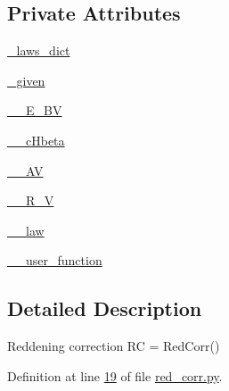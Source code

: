 \subsection*{Private Attributes}
\begin{DoxyCompactItemize}
\item 
\hyperlink{classpyneb_1_1extinction_1_1red__corr_1_1_red_corr_a96fbed6f54a26dd2f59fe6441c9c3865}{\-\_\-laws\-\_\-dict}
\item 
\hyperlink{classpyneb_1_1extinction_1_1red__corr_1_1_red_corr_a99ab4dcd33d50360f4fb61bc80fc90d5}{\-\_\-given}
\item 
\hyperlink{classpyneb_1_1extinction_1_1red__corr_1_1_red_corr_ad223ec4556fb47fc607488c318e58b13}{\-\_\-\-\_\-\-E\-\_\-\-B\-V}
\item 
\hyperlink{classpyneb_1_1extinction_1_1red__corr_1_1_red_corr_ab91dff40a007dd632c35d98042077f3d}{\-\_\-\-\_\-c\-Hbeta}
\item 
\hyperlink{classpyneb_1_1extinction_1_1red__corr_1_1_red_corr_a476840870719872a12ab48a0d1f1a839}{\-\_\-\-\_\-\-A\-V}
\item 
\hyperlink{classpyneb_1_1extinction_1_1red__corr_1_1_red_corr_a93f7e44201375bc6e05a20c092b6a1d6}{\-\_\-\-\_\-\-R\-\_\-\-V}
\item 
\hyperlink{classpyneb_1_1extinction_1_1red__corr_1_1_red_corr_a08b0e3499e1b8a289d7b2c7e805e6129}{\-\_\-\-\_\-law}
\item 
\hyperlink{classpyneb_1_1extinction_1_1red__corr_1_1_red_corr_aaf6e0eb6732be82bc65b02c36a2429c2}{\-\_\-\-\_\-user\-\_\-function}
\end{DoxyCompactItemize}


\subsection{Detailed Description}
\begin{DoxyVerb}Reddening correction
RC = RedCorr()\end{DoxyVerb}
 

Definition at line \hyperlink{red__corr_8py_source_l00019}{19} of file \hyperlink{red__corr_8py_source}{red\-\_\-corr.\-py}.



